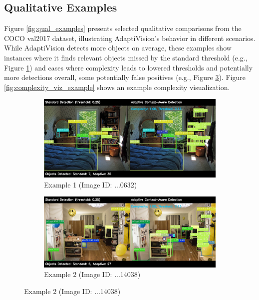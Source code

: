 \documentclass{article}
\begin{document}
\subsection{Qualitative Examples}
Figure \ref{fig:qual_examples} presents selected qualitative comparisons from the COCO val2017 dataset, illustrating AdaptiVision's behavior in different scenarios. While AdaptiVision detects more objects on average, these examples show instances where it finds relevant objects missed by the standard threshold (e.g., Figure \ref{fig:qual_632}) and cases where complexity leads to lowered thresholds and potentially more detections overall, some potentially false positives (e.g., Figure \ref{fig:qual_14038}). Figure \ref{fig:complexity_viz_example} shows an example complexity visualization.

\begin{figure}[t]
    \centering
    \begin{subfigure}[b]{0.48\textwidth}
        \includegraphics[width=\linewidth]{figures/comparison_000000000632.jpg}
        \caption{Example 1 (Image ID: ...0632)}
        \label{fig:qual_632}
    \end{subfigure}
    \hfill
    \begin{subfigure}[b]{0.48\textwidth}
        \includegraphics[width=\linewidth]{figures/comparison_000000014038.jpg}
        \caption{Example 2 (Image ID: ...14038)}
        \label{fig:qual_14038}
    \end{subfigure}
    

\end{figure}
\end{document}
